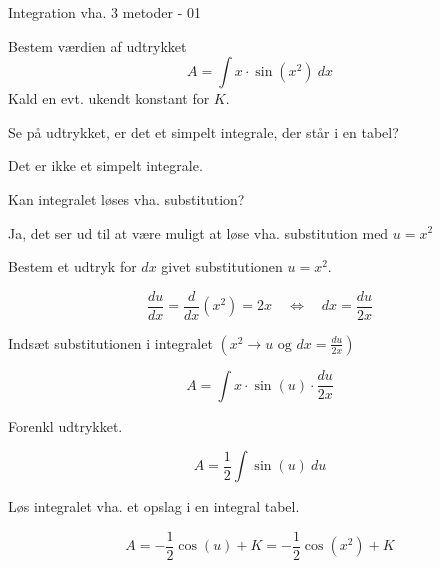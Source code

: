 \documentclass{article}
\begin{document}
\tableofcontents


\begin{exercise}{Integration vha. 3 metoder - 01}
	
	Bestem værdien af udtrykket
	\[
	A = \int x \cdot \sin(x^2) \ dx
	\]
	Kald en evt. ukendt konstant for $K$.
	
	
	
	\hint
	Se på udtrykket, er det et simpelt integrale, der står i en tabel?
	
	\hint
	Det er ikke et simpelt integrale.
	
	\hint
	Kan integralet løses vha. substitution?
	
	\hint
	Ja, det ser ud til at være muligt at løse vha. substitution med $u=x^2$
	
	\hint
	Bestem et udtryk for $dx$ givet substitutionen $u=x^2$.
	
	\hint
	\[
	\frac{du}{dx} = \frac{d}{dx} \left(x^2 \right) = 2x \quad \Leftrightarrow \quad dx = \frac{du}{2x}
	\]
	
	\hint
	Indsæt substitutionen i integralet $\left(x^2 \rightarrow u \textrm{ og } dx = \frac{du}{2x} \right)$
	
	\hint
	\[
	A =  \int x \cdot \sin(u) \cdot \frac{du}{2x}
	\]
	
	\hint
	Forenkl udtrykket.
	
	\hint
	\[
	A= \frac{1}{2} \int \sin(u) \ du
	\]
	
	\hint
	Løs integralet vha. et opslag i en integral tabel.
	
	\hint
	\[
	A = - \frac{1}{2} \cos(u) + K = - \frac{1}{2} \cos(x^2) + K
	\]
	
	
\end{exercise}

\newpage
\end{document}
